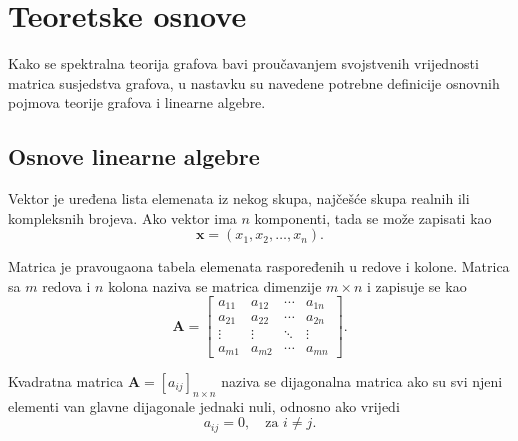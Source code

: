 
\chapter{Teoretske osnove}

Kako se spektralna teorija grafova bavi proučavanjem svojstvenih vrijednosti matrica susjedstva grafova, u nastavku su navedene potrebne definicije osnovnih pojmova teorije grafova i linearne algebre.

\section{Osnove linearne algebre}

\begin{definition}
Vektor je uređena lista elemenata iz nekog skupa, najčešće skupa realnih ili kompleksnih brojeva. 
Ako vektor ima \(n\) komponenti, tada se može zapisati kao
\begin{equation}
    \mathbf{x} = (x_1, x_2, \ldots, x_n).
\end{equation}
\end{definition}
\begin{definition}
Matrica je pravougaona tabela elemenata raspoređenih u redove i kolone. 
Matrica sa \(m\) redova i \(n\) kolona naziva se matrica dimenzije \(m \times n\) i zapisuje se kao
\begin{equation}
    \mathbf{A} =
    \begin{bmatrix}
        a_{11} & a_{12} & \cdots & a_{1n} \\
        a_{21} & a_{22} & \cdots & a_{2n} \\
        \vdots & \vdots & \ddots & \vdots \\
        a_{m1} & a_{m2} & \cdots & a_{mn}
    \end{bmatrix}.
\end{equation}
\end{definition}

\begin{definition}
Kvadratna matrica \(\mathbf{A}=[a_{ij}]_{n \times n}\) naziva se dijagonalna matrica ako su svi njeni elementi van glavne dijagonale jednaki nuli, odnosno ako vrijedi
\begin{equation}
    a_{ij}=0, \quad \text{za } i \neq j.
\end{equation} \cite{chung1997spectral}
\end{definition}

